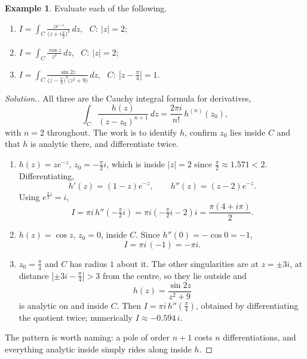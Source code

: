 \documentclass[11pt,a4paper]{article}
\theoremstyle{definition}
\newtheorem{example}[thm]{Example}
\newenvironment{solution}
  {\renewcommand{\qedsymbol}{}\begin{proof}[\textit{Solution}.]}
  {\end{proof}}
\begin{document}
\begin{example}
Evaluate each of the following.
\begin{enumerate}
\item $\displaystyle{I = \int_C \frac{z e^{-z}}{\big( z + i\frac{\pi}{2}\big)^3}\,dz}$, \ $C:\ \left|z\right| = 2$;
\item $\displaystyle{I =\int_C \frac{\cos z}{z^3}\,dz}$, \ $C:\ \left|z\right| = 2$;
\item $\displaystyle{I = \int_C \frac{\sin 2z}{\big(z - \frac{\pi}{4}\big)^3\big(z^2 + 9\big)}\,dz}$, \ $C:\ \left|z - \frac{\pi}{4}\right| = 1$.
\end{enumerate}
\end{example}
\begin{solution}
All three are the Cauchy integral formula for derivatives,
$$\int_C\frac{h(z)}{(z-z_0)^{n+1}}\,dz=\frac{2\pi i}{n!}\,h^{(n)}(z_0),$$
with $n=2$ throughout. The work is to identify $h$, confirm $z_0$ lies inside
$C$ and that $h$ is analytic there, and differentiate twice.

\begin{enumerate}
\item $h(z)=ze^{-z}$, $z_0=-\frac{\pi}{2}i$, which is inside $\left|z\right|=2$
since $\frac{\pi}{2}\approx 1.571<2$. Differentiating,
$$h'(z)=(1-z)e^{-z},\qquad h''(z)=(z-2)e^{-z}.$$
Using $e^{\frac{\pi}{2}i}=i$,
$$I=\pi i\,h''\!\left(-\tfrac{\pi}{2}i\right)
=\pi i\left(-\tfrac{\pi}{2}i-2\right)i=\frac{\pi(4+i\pi)}{2}.$$

\item $h(z)=\cos z$, $z_0=0$, inside $C$. Since $h''(0)=-\cos 0=-1$,
$$I=\pi i\,(-1)=-\pi i .$$

\item $z_0=\frac{\pi}{4}$ and $C$ has radius $1$ about it. The other
singularities are at $z=\pm 3i$, at distance
$\left|\pm 3i-\frac{\pi}{4}\right|>3$ from the centre, so they lie outside and
$$h(z)=\frac{\sin 2z}{z^2+9}$$
is analytic on and inside $C$. Then $I=\pi i\,h''\!\left(\frac{\pi}{4}\right)$,
obtained by differentiating the quotient twice; numerically
$I\approx -0.594\,i$.
\end{enumerate}
The pattern is worth naming: a pole of order $n+1$ costs $n$ differentiations,
and everything analytic inside simply rides along inside $h$.
\end{solution}
\end{document}

